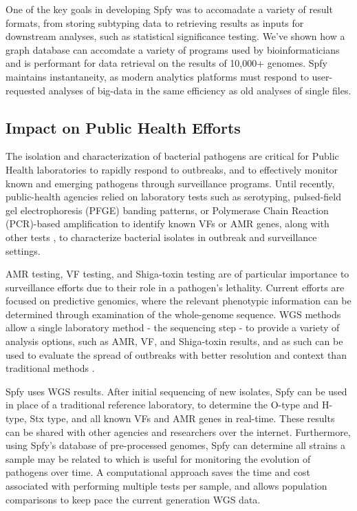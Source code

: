 \documentclass{article}
\begin{document}
One of the key goals in developing Spfy was to accomadate a variety of result formats, from storing subtyping data to retrieving results as inputs for downstream analyses, such as statistical significance testing. We've shown how a graph database can accomdate a variety of programs used by bioinformaticians and is performant for data retrieval on the results of 10,000+ genomes. Spfy maintains instantaneity, as modern analytics platforms must respond to user-requested analyses of big-data in the same efficiency as old analyses of single files.

\subsection{Impact on Public Health Efforts}

The isolation and characterization of bacterial pathogens are critical for Public Health laboratories to rapidly respond to outbreaks, and to effectively monitor known and emerging pathogens through surveillance programs.
Until recently, public-health agencies relied on laboratory tests such as serotyping, pulsed-field gel electrophoresis (PFGE) banding patterns, or Polymerase Chain Reaction (PCR)-based amplification to identify known VFs or AMR genes, along with other tests \cite{ronholm2016navigating}, to characterize bacterial isolates in outbreak and surveillance settings.

AMR testing, VF testing, and Shiga-toxin testing are of particular importance to surveillance efforts due to their role in a pathogen's lethality.
Current efforts are focused on predictive genomics, where the relevant phenotypic information can be determined through examination of the whole-genome sequence.
WGS methods allow a single laboratory method - the sequencing step - to provide a variety of analysis options, such as AMR, VF, and Shiga-toxin results, and as such can be used to evaluate the spread of outbreaks with better resolution and context than traditional methods \cite{ronholm2016navigating}.

Spfy uses WGS results.
After initial sequencing of new isolates, Spfy can be used in place of a traditional reference laboratory, to determine the O-type and H-type, Stx type, and all known VFs and AMR genes in real-time.
These results can be shared with other agencies and researchers over the internet.
Furthermore, using Spfy's database of pre-processed genomes, Spfy can determine all strains a sample may be related to which is useful for monitoring the evolution of pathogens over time.
A computational approach saves the time and cost associated with performing multiple tests per sample, and allows population comparisons to keep pace the current generation WGS data.
\end{document}
